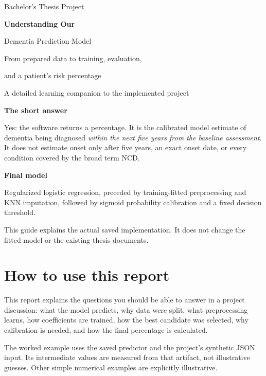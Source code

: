 \begin{titlepage}\centering\vspace*{28mm}
{\Large Bachelor's Thesis Project\par}\vspace{16mm}
{\Huge\bfseries Understanding Our\par Dementia Prediction Model\par}\vspace{12mm}
{\Large From prepared data to training, evaluation,\par and a patient's risk percentage\par}\vspace{18mm}
{\large A detailed learning companion to the implemented project\par}\vfill
\begin{minipage}{.87\textwidth}
\textbf{The short answer}\par
Yes: the software returns a percentage. It is the calibrated model estimate of dementia being diagnosed \emph{within the next five years from the baseline assessment}. It does not estimate onset only after five years, an exact onset date, or every condition covered by the broad term NCD.

\textbf{Final model}\par
Regularized logistic regression, preceded by training-fitted preprocessing and KNN imputation, followed by sigmoid probability calibration and a fixed decision threshold.

This guide explains the actual saved implementation. It does not change the fitted model or the existing thesis documents.
\end{minipage}\vspace{15mm}
\end{titlepage}\setcounter{page}{2}

\section*{How to use this report}
This report explains the questions you should be able to answer in a project discussion: what the model predicts, why data were split, what preprocessing learns, how coefficients are trained, how the best candidate was selected, why calibration is needed, and how the final percentage is calculated.

The worked example uses the saved predictor and the project's synthetic JSON input. Its intermediate values are measured from that artifact, not illustrative guesses. Other simple numerical examples are explicitly illustrative.

